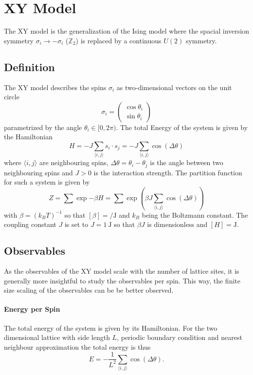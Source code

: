 \section{XY Model}\label{sec:theo:xy_model}
	The XY model is the generalization of the Ising model where the spacial inversion symmetry $\sigma_i \rightarrow -\sigma_i$ ($\mathbb{Z}_2$) is replaced by a continuous $U(2)$ symmetry.
	
	\subsection{Definition}
		The XY model describes the spins $\sigma_i$ as two-dimensional vectors on the unit circle
		\begin{equation}\label{eq:hamiltonian}
			\sigma_i = \begin{pmatrix}
				\cos{\theta_i} \\ \sin{\theta_i}
			\end{pmatrix}
		\end{equation}
		parametrized by the angle $\theta_i \in [0,2\pi)$. The total Energy of the system is given by the Hamiltonian
		\begin{equation}
			H = -J \sum_{\langle i, j \rangle}{s_i \cdot s_j} = -J \sum_{\langle i, j \rangle}{\cos(\Delta \theta)}
		\end{equation}
		where $\langle i,j \rangle$ are neighbouring spins, $\Delta \theta = \theta_i - \theta_j$ is the angle between two neighbouring spins and $J>0$ is the interaction strength. The partition function for such a system is given by
		\begin{equation}
			Z = \sum{\exp{-\beta H}} = \sum{\exp{ \left( \beta J \sum_{\langle i, j \rangle}{\cos(\Delta \theta)} \right) }}
		\end{equation}
		with $\beta = (k_B T)^{-1}$ so that $[\beta] = \si{\per\joule}$ and $k_B$ being the Boltzmann constant. The coupling constant $J$ is set to $J = \SI{1}{\joule}$ so that $\beta J$ is dimensionless and $[H] = \si{\joule}$. 
		
	\subsection{Observables}
		As the observables of the XY model scale with the number of lattice sites, it is generally more insightful to study the observables per spin. This way, the finite size scaling of the observables can be be better observed.
	
		\paragraph{Energy per Spin}
			The total energy of the system is given by its Hamiltonian. For the two dimensional lattice with side length $L$, periodic boundary condition and nearest neighbour approximation the total energy is thus
			\begin{equation}\label{eq:energy}
				E = - \frac{1}{L^2} \sum_{\langle i, j \rangle}{\cos(\Delta \theta)}.
			\end{equation}
		
